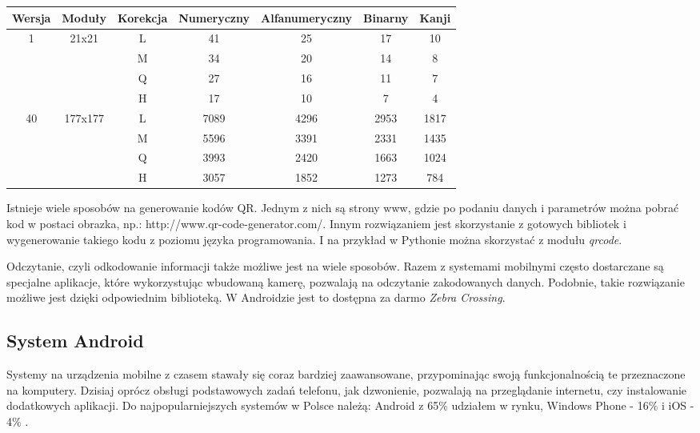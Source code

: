 \begin{center}
	\begin{tabular}{| c | c | c | c | c | c | c |}
		\hline
		Wersja & Moduły & Korekcja & Numeryczny & Alfanumeryczny & Binarny & Kanji\\
		\hline
		\multirow{4}{*}{1} & \multirow{4}{*}{21x21}&L&41&25&17&10\\
		& & M&34&20&14&8\\
		& & Q&27&16&11&7\\
		& & H&17&10&7&4\\
		\hline
		\multirow{4}{*}{40} & \multirow{4}{*}{177x177}&L&7089&4296&2953&1817\\
		& & M&5596&3391&2331&1435\\
		& & Q&3993&2420&1663&1024\\
		& & H&3057&1852&1273&784\\
		\hline
	\end{tabular}
\end{center} 
Istnieje wiele sposobów na generowanie kodów QR. Jednym z nich są strony www, gdzie po podaniu danych i parametrów można pobrać kod w postaci obrazka, np.: http://www.qr-code-generator.com/. Innym rozwiązaniem jest skorzystanie z gotowych bibliotek i wygenerowanie takiego kodu z poziomu języka programowania. I na przykład w Pythonie można skorzystać z modułu \textit{qrcode}.

Odczytanie, czyli odkodowanie informacji także możliwe jest na wiele sposobów. Razem z systemami mobilnymi często dostarczane są specjalne aplikacje, które wykorzystując wbudowaną kamerę, pozwalają na odczytanie zakodowanych danych. Podobnie, takie rozwiązanie możliwe jest dzięki odpowiednim biblioteką. W Androidzie jest to dostępna za darmo \textit{Zebra Crossing}.


\subsection{System Android}
Systemy na urządzenia mobilne z czasem stawały się coraz bardziej zaawansowane, przypominając swoją funkcjonalnością te przeznaczone na komputery. Dzisiaj oprócz obsługi podstawowych zadań telefonu, jak dzwonienie, pozwalają na przeglądanie internetu, czy instalowanie dodatkowych aplikacji. Do najpopularniejszych systemów w Polsce należą: Android z 65\% udziałem w rynku, Windows Phone - 16\% i iOS - 4\% \cite{polska_jest_mobi}.



